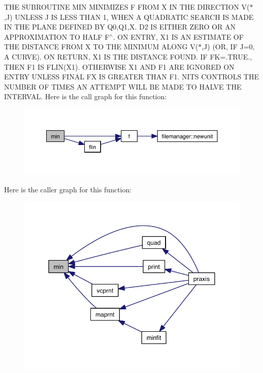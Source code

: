 T\+HE S\+U\+B\+R\+O\+U\+T\+I\+NE M\+IN M\+I\+N\+I\+M\+I\+Z\+ES F F\+R\+OM X IN T\+HE D\+I\+R\+E\+C\+T\+I\+ON V($\ast$,\+J) U\+N\+L\+E\+SS J IS L\+E\+SS T\+H\+AN 1, W\+H\+EN A Q\+U\+A\+D\+R\+A\+T\+IC S\+E\+A\+R\+CH IS M\+A\+DE IN T\+HE P\+L\+A\+NE D\+E\+F\+I\+N\+ED BY Q0,Q1,X. D2 IS E\+I\+T\+H\+ER Z\+E\+RO OR AN A\+P\+P\+R\+O\+X\+I\+M\+A\+T\+I\+ON TO H\+A\+LF F$^\wedge$. ON E\+N\+T\+RY, X1 IS AN E\+S\+T\+I\+M\+A\+TE OF T\+HE D\+I\+S\+T\+A\+N\+CE F\+R\+OM X TO T\+HE M\+I\+N\+I\+M\+UM A\+L\+O\+NG V($\ast$,\+J) (OR, IF J=0, A C\+U\+R\+VE). ON R\+E\+T\+U\+RN, X1 IS T\+HE D\+I\+S\+T\+A\+N\+CE F\+O\+U\+ND. IF FK=.T\+R\+UE., T\+H\+EN F1 IS F\+L\+I\+N(\+X1). O\+T\+H\+E\+R\+W\+I\+SE X1 A\+ND F1 A\+RE I\+G\+N\+O\+R\+ED ON E\+N\+T\+RY U\+N\+L\+E\+SS F\+I\+N\+AL FX IS G\+R\+E\+A\+T\+ER T\+H\+AN F1. N\+I\+TS C\+O\+N\+T\+R\+O\+LS T\+HE N\+U\+M\+B\+ER OF T\+I\+M\+ES AN A\+T\+T\+E\+M\+PT W\+I\+LL BE M\+A\+DE TO H\+A\+L\+VE T\+HE I\+N\+T\+E\+R\+V\+AL. Here is the call graph for this function\+:\nopagebreak
\begin{figure}[H]
\begin{center}
\leavevmode
\includegraphics[width=350pt]{praxis_8f_ad17dd523e058957564e309fed67cfa20_cgraph}
\end{center}
\end{figure}
Here is the caller graph for this function\+:\nopagebreak
\begin{figure}[H]
\begin{center}
\leavevmode
\includegraphics[width=350pt]{praxis_8f_ad17dd523e058957564e309fed67cfa20_icgraph}
\end{center}
\end{figure}
\mbox{\label{praxis_8f_a4deca9e8eeda59dc7ea99e26c38d4a6d}} 
